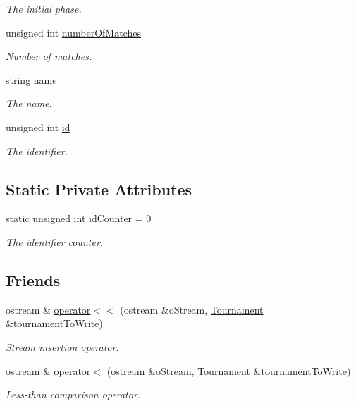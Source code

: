 \begin{DoxyCompactItemize}
\begin{DoxyCompactList}\small\item\em The initial phase. \end{DoxyCompactList}\item 
unsigned int \hyperlink{class_tournament_a3b41df083ed5b33411e307ad1859ab6d}{number\+Of\+Matches}
\begin{DoxyCompactList}\small\item\em Number of matches. \end{DoxyCompactList}\item 
string \hyperlink{class_tournament_a6d4f678a73d89147d34bb1d0c50cc976}{name}
\begin{DoxyCompactList}\small\item\em The name. \end{DoxyCompactList}\item 
unsigned int \hyperlink{class_tournament_a15cf54c0cde58d9a29c9700808173a8c}{id}
\begin{DoxyCompactList}\small\item\em The identifier. \end{DoxyCompactList}\end{DoxyCompactItemize}
\subsection*{Static Private Attributes}
\begin{DoxyCompactItemize}
\item 
static unsigned int \hyperlink{class_tournament_a02145894ee5d8aedffa86b6444cf4205}{id\+Counter} = 0
\begin{DoxyCompactList}\small\item\em The identifier counter. \end{DoxyCompactList}\end{DoxyCompactItemize}
\subsection*{Friends}
\begin{DoxyCompactItemize}
\item 
ostream \& \hyperlink{class_tournament_a30a1cb2d3a53d0cc6c77c5f29449305c}{operator$<$$<$} (ostream \&o\+Stream, \hyperlink{class_tournament}{Tournament} \&tournament\+To\+Write)
\begin{DoxyCompactList}\small\item\em Stream insertion operator. \end{DoxyCompactList}\item 
ostream \& \hyperlink{class_tournament_ac1914f90b80482b534f7a20273ea5b60}{operator$<$} (ostream \&o\+Stream, \hyperlink{class_tournament}{Tournament} \&tournament\+To\+Write)
\begin{DoxyCompactList}\small\item\em Less-\/than comparison operator. \end{DoxyCompactList}\end{DoxyCompactItemize}


